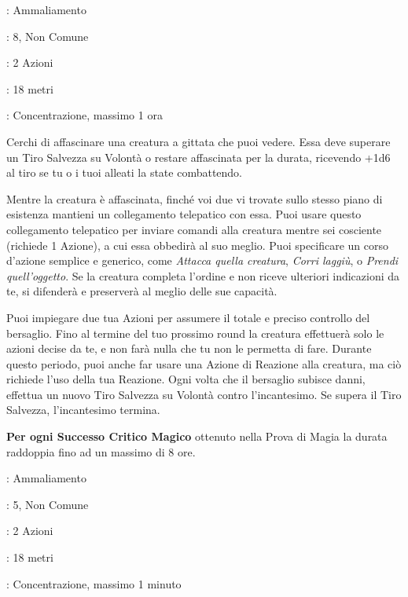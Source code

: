 \begin{multicols}{2}
\noindent\colorbox{OBSSgold!10}{
\begin{minipage}{0.95\linewidth}
\begin{description}[noitemsep, topsep=0pt, parsep=0pt, partopsep=0pt, leftmargin=0cm, labelwidth=1.3cm]
	\item[\textbf{Lista}]: Ammaliamento
	\item[\textbf{Livello}]: 8, Non Comune
	\item[\textbf{Lancio}]: 2 Azioni
	\item[\textbf{Gittata}]: 18 metri
	\item[\textbf{Durata}]: Concentrazione, massimo 1 ora
\end{description}
\end{minipage}}\smallskip

Cerchi di affascinare una creatura a gittata che puoi vedere. Essa deve superare un Tiro Salvezza su Volontà o restare affascinata per la durata, ricevendo +1d6 al tiro se tu o i tuoi alleati la state combattendo.

Mentre la creatura è affascinata, finché voi due vi trovate sullo stesso piano di esistenza mantieni un collegamento telepatico con essa. Puoi usare questo collegamento telepatico per inviare comandi alla creatura mentre sei cosciente (richiede 1 Azione), a cui essa obbedirà al suo meglio. Puoi specificare un corso d'azione semplice e generico, come \emph{Attacca quella creatura}, \emph{Corri laggiù}, o \emph{Prendi quell'oggetto}. Se la creatura completa l'ordine e non riceve ulteriori indicazioni da te, si difenderà e preserverà al meglio delle sue capacità.

Puoi impiegare due tua Azioni per assumere il totale e preciso controllo del bersaglio. Fino al termine del tuo prossimo round la creatura effettuerà solo le azioni decise da te, e non farà nulla che tu non le permetta di fare. Durante questo periodo, puoi anche far usare una Azione di Reazione alla creatura, ma ciò richiede l'uso della tua Reazione. Ogni volta che il bersaglio subisce danni, effettua un nuovo Tiro Salvezza su Volontà contro l'incantesimo. Se supera il Tiro Salvezza, l'incantesimo termina.

\textbf{Per ogni Successo Critico Magico} ottenuto nella Prova di Magia la durata raddoppia fino ad un massimo di 8 ore.

\noindent\colorbox{OBSSgold!10}{
\begin{minipage}{0.95\linewidth}
\begin{description}[noitemsep, topsep=0pt, parsep=0pt, partopsep=0pt, leftmargin=0cm, labelwidth=1.3cm]
	\item[\textbf{Lista}]: Ammaliamento
	\item[\textbf{Livello}]: 5, Non Comune
	\item[\textbf{Lancio}]: 2 Azioni
	\item[\textbf{Gittata}]: 18 metri
	\item[\textbf{Durata}]: Concentrazione, massimo 1 minuto
\end{description}
\end{minipage}}\smallskip


\end{multicols}
